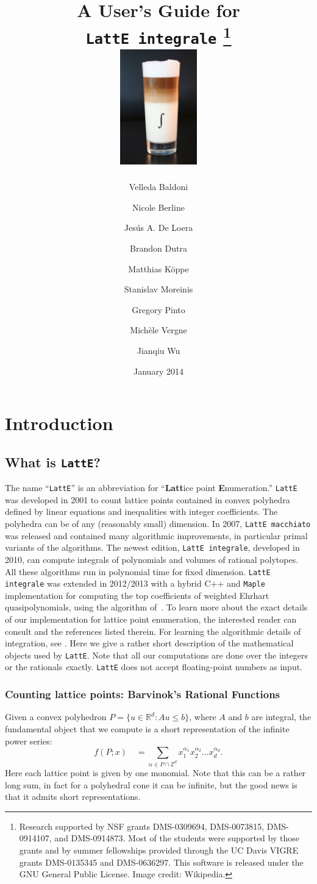 \documentclass{article}
\title{A User's Guide for\\ {\tt LattE integrale} \latteV 
\footnote{Research supported by NSF grants DMS-0309694, 
DMS-0073815, DMS-0914107, and DMS-0914873.
Most of the students were supported by those
grants and by summer fellowships provided through the UC Davis VIGRE grants
DMS-0135345 and DMS-0636297. This
software is released under the GNU General Public License.  Image credit: Wikipedia.}
\\[4ex] \includegraphics[width=0.25\textwidth]{latte-integrale.jpg}
}%
\author{
Velleda Baldoni \and
Nicole Berline \and 
Jes\'us A. De Loera \and
Brandon Dutra \and
Matthias K\"oppe \and 
Stanislav Moreinis \and
Gregory Pinto \and
Mich\`ele Vergne \and
Jianqiu Wu \and
}
\date{January 2014}
\newcommand{\Z}{{\mathbb Z}}
\newcommand{\R}{{\mathbb R}}
\newcommand{\latte}{{\tt LattE}\xspace}
\newcommand{\latteInt}{{\tt LattE integrale}\xspace}
\newcommand{\maple}{{\tt Maple}\xspace}
\begin{document}
\maketitle{}

\newpage

\tableofcontents

\newpage

\section{Introduction}

\subsection{What is {\tt LattE}?} \label{intro}

The name ``{\tt LattE}'' is an abbreviation for ``{\bf Latt}ice point 
{\bf E}numeration.'' \latte was developed in 2001 to count lattice points contained in 
convex polyhedra defined by linear equations and inequalities with 
integer coefficients. The polyhedra can be of any (reasonably small) 
dimension. In 2007, {\tt LattE macchiato} was released and contained many 
algorithmic improvements, in particular primal variants of the algorithms. The newest edition, \latteInt, developed
in 2010, can compute integrals of polynomials and volumes of rational polytopes. 
All these algorithms run in polynomial
time for fixed dimension. 
\latteInt was extended in 2012/2013 with a hybrid C++ and \maple
implementation for computing the top coefficients of weighted Ehrhart
quasipolynomials, using the algorithm of~\cite{so-called-paper-1}. 
To
learn more about the exact details of our implementation for lattice point enumeration, the interested reader can consult 
\cite{koeppe:irrational-barvinok, latte1} and the references listed therein. 
For learning the algorithmic details of integration, see \cite{howToIntegratePolynomialSimplex, latte-integrale-paper}. Here we
give a rather short description of the mathematical objects used by
{\tt LattE}. Note that all our computations are done over the integers or the rationals {\emph exactly}.
\latte does not accept floating-point numbers as input. 

\subsubsection{Counting lattice points: Barvinok's Rational Functions}

Given a convex polyhedron $P = \{u\in\R^d:Au\leq b\}$, where $A$ and
$b$ are integral, the fundamental object that we compute is a short 
representation of the infinite power series:
\[
f(P;x) \quad = \sum_{\alpha\in P\cap\Z^d} x_1^{\alpha_1}
x_2^{\alpha_2} \ldots x_d^{\alpha_d}.
\]
Here each lattice point is given by one monomial. Note that this can be 
a rather long sum, in fact for a polyhedral cone it can be infinite, but 
the good news is that it admits short representations.
\end{document}
